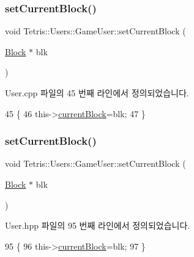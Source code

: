 \subsubsection{\texorpdfstring{set\+Current\+Block()}{setCurrentBlock()}\hspace{0.1cm}{\footnotesize\ttfamily [1/2]}}
{\footnotesize\ttfamily void Tetris\+::\+Users\+::\+Game\+User\+::set\+Current\+Block (\begin{DoxyParamCaption}\item[{\hyperlink{class_tetris_1_1_block}{Block} $\ast$}]{blk }\end{DoxyParamCaption})}



User.\+cpp 파일의 45 번째 라인에서 정의되었습니다.


\begin{DoxyCode}
45                                                         \{
46                     this->\hyperlink{class_tetris_1_1_users_1_1_game_user_a65c4841efffdf4b6fbe8ac30fb2fb5d1}{currentBlock}=blk;
47                 \}
\end{DoxyCode}
\mbox{\label{class_tetris_1_1_users_1_1_game_user_ae1743f8024d25ed74d7b2e456907ee41}} 
\subsubsection{\texorpdfstring{set\+Current\+Block()}{setCurrentBlock()}\hspace{0.1cm}{\footnotesize\ttfamily [2/2]}}
{\footnotesize\ttfamily void Tetris\+::\+Users\+::\+Game\+User\+::set\+Current\+Block (\begin{DoxyParamCaption}\item[{\hyperlink{class_tetris_1_1_block}{Block} $\ast$}]{blk }\end{DoxyParamCaption})\hspace{0.3cm}{\ttfamily [inline]}}



User.\+hpp 파일의 95 번째 라인에서 정의되었습니다.


\begin{DoxyCode}
95                                                 \{
96                     this->\hyperlink{class_tetris_1_1_users_1_1_game_user_a65c4841efffdf4b6fbe8ac30fb2fb5d1}{currentBlock}=blk;
97                 \}
\end{DoxyCode}
\mbox{\label{class_tetris_1_1_users_1_1_game_user_aa37f3ed5891a4efecc09f92188b8a9cd}} 
